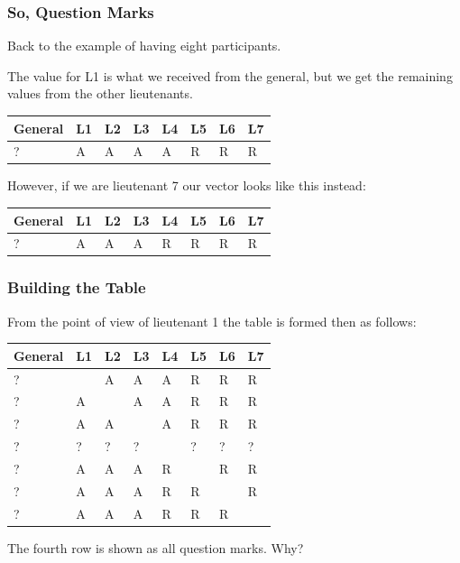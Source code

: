 \begin{frame}
\frametitle{So, Question Marks}

Back to the example of having eight participants.

The value for L1 is what we received from the general, but we get the remaining values from the other lieutenants.

\begin{center}
\begin{tabular}{|l|l|l|l|l|l|l|l|}
\hline
General & L1 & L2 & L3 & L4 & L5 & L6 & L7 \\	
\hline
? & A & A & A & A & R & R & R \\
\hline
\end{tabular}
\end{center}

However, if we are lieutenant 7 our vector looks like this instead:

\begin{center}
\begin{tabular}{|l|l|l|l|l|l|l|l|}
\hline
General & L1 & L2 & L3 & L4 & L5 & L6 & L7 \\	
\hline
? & A & A & A & R & R & R & R \\
\hline
\end{tabular}
\end{center}

\end{frame}

\begin{frame}
\frametitle{Building the Table}

From the point of view of lieutenant 1 the table is formed then as follows: 

\begin{center}
\begin{tabular}{|l|l|l|l|l|l|l|l|}
\hline
General & L1 & L2 & L3 & L4 & L5 & L6 & L7 \\	
\hline
? & ~ & A & A & A & R & R & R \\ \hline
? & A & ~ & A & A & R & R & R \\ \hline
? & A & A & ~ & A & R & R & R \\ \hline
? & ? & ? & ? & ~ & ? & ? & ? \\ \hline
? & A & A & A & R & ~ & R & R \\ \hline
? & A & A & A & R & R & ~ & R \\ \hline
? & A & A & A & R & R & R & ~ \\ \hline
\end{tabular}
\end{center}

The fourth row is shown as all question marks. Why?

\end{frame}

